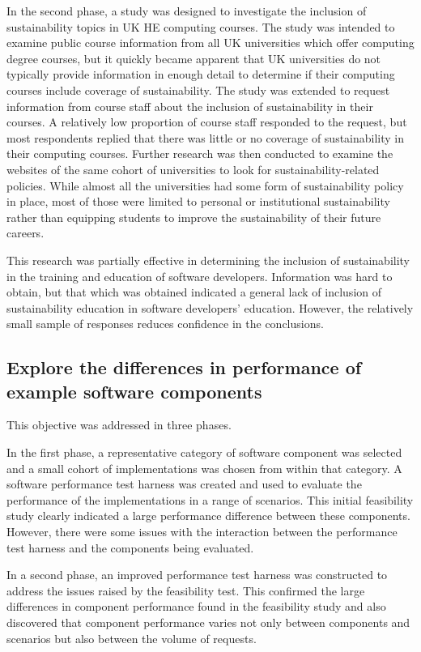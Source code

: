 In the second phase, a study was designed to investigate the inclusion of sustainability topics in UK HE computing courses. The study was intended to examine public course information from all UK universities which offer computing degree courses, but it quickly became apparent that UK universities do not typically provide information in enough detail to determine if their computing courses include coverage of sustainability. The study was extended to request information from course staff about the inclusion of sustainability in their courses. A relatively low proportion of course staff responded to the request, but most respondents replied that there was little or no coverage of sustainability in their computing courses. Further research was then conducted to examine the websites of the same cohort of universities to look for sustainability-related policies. While almost all the universities had some form of sustainability policy in place, most of those were limited to personal or institutional sustainability rather than equipping students to improve the sustainability of their future careers.

This research was partially effective in determining the inclusion of sustainability in the training and education of software developers. Information was hard to obtain, but that which was obtained indicated a general lack of inclusion of sustainability education in software developers' education. However, the relatively small sample of responses reduces confidence in the conclusions.

\subsection{Explore the differences in performance of example software components}

This objective was addressed in three phases.

In the first phase, a representative category of software component was selected and a small cohort of implementations was chosen from within that category. A software performance test harness was created and used to evaluate the performance of the implementations in a range of scenarios. This initial feasibility study clearly indicated a large performance difference between these components. However, there were some issues with the interaction between the performance test harness and the components being evaluated.

In a second phase, an improved performance test harness was constructed to address the issues raised by the feasibility test. This confirmed the large differences in component performance found in the feasibility study and also discovered that component performance varies not only between components and scenarios but also between the volume of requests.

